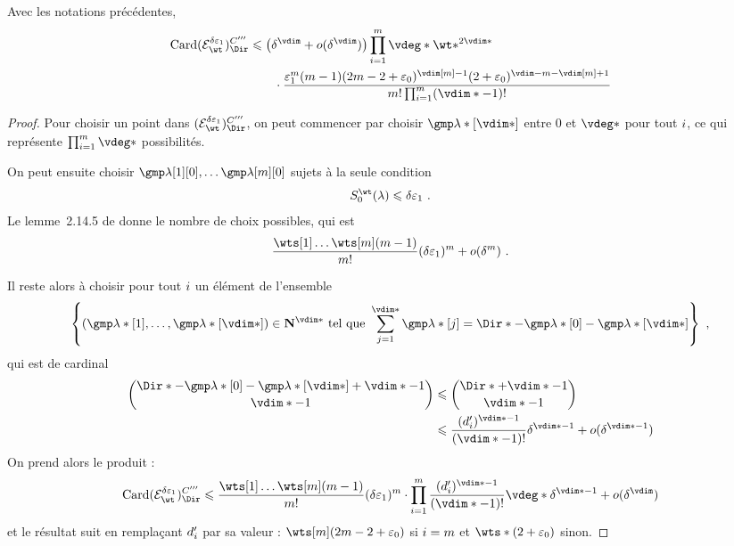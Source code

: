 \begin{lem}
  Avec les notations précédentes,
  \begin{align}
    \card (\stairs)\Ciii
    & \le
    \bigl(\delta^\vdim + o(\delta^\vdim)\bigr)
    \prod\fctrange \vdeg* \wt*^{2\vdim*}
    \\ & \qquad \cdot
    \frac {
      \epsi^\puiss (\puiss-1)
      (2\puiss - 2 + \epsz) ^{\vdim[\puiss]-1}
      (2 + \epsz) ^{\vdim - \puiss - \vdim[\puiss] + 1}
      }{
      \puiss! \prod\fctrange (\vdim* - 1)!
      }
  \end{align}
\end{lem}

\begin{proof}
  Pour choisir un point dans \( (\stairs)\Ciii \), on peut commencer par
  choisir \( \imp*[\vdim*] \) entre \( 0 \) et \( \vdeg* \)
  pour tout \( i \), ce qui représente \( \prod\fctrange \vdeg* \)
  possibilités.

  On peut ensuite choisir \( \imp[1][0], \dots \imp[\puiss][0] \)
  sujets à la seule condition
  \begin{equation}
    \wtsum*(\lambda) \le \delta \epsi \pmm.
  \end{equation}
  Le lemme~2.14.5 de \cite{farhith} donne le nombre de choix possibles, qui
  est
  \begin{equation}
    \frac {\prodwt} {\puiss !} (\delta\epsi)^\puiss
    + o(\delta^\puiss)
    \pmm.
  \end{equation}

  Il reste alors à choisir pour tout \( i \) un élément de l'ensemble
  \begin{equation}
    \left\{
      (\imp*[1],  \dots, \imp*[\vdim*])
      \in \N ^{\vdim*}
      \text{ tel que }
      \sum_{j=1}^{\vdim*} \imp*[j]
      =
      \Dir* - \imp*[0] - \imp*[\vdim*]
    \right\}
    \pmm,
  \end{equation}
  qui est de cardinal
  \begin{align}
    \binom {
      \Dir* - \imp*[0] - \imp*[\vdim*] + \vdim* - 1
      }{
      \vdim* - 1
      }
    & \le
    \binom {
      \Dir* + \vdim* - 1
      }{
      \vdim* - 1
      }
    \\
    & \le
    \frac {(d'_\fct)^{\vdim* - 1}} {(\vdim* - 1)!} \delta^{\vdim* - 1}
    + o( \delta^{\vdim* - 1} )
  \end{align}
  On prend alors le produit :
  \begin{equation}
    \card (\stairs)\Ciii
    \le
    \frac {\prodwt} {\puiss !} (\delta\epsi)^\puiss
    \cdot \prod\fctrange
    \frac {(d'_\fct)^{\vdim* - 1}} {(\vdim* - 1)!}
    \vdeg* \delta^{\vdim* - 1}
    + o( \delta^\vdim )
  \end{equation}
  et le résultat suit en remplaçant \( d'_i \) par sa valeur : \(
    \wts[\puiss] (2\puiss - 2 + \epsz) \) si \( i = m \) et \( \wts*
    (2 + \epsz) \) sinon.
\end{proof}

